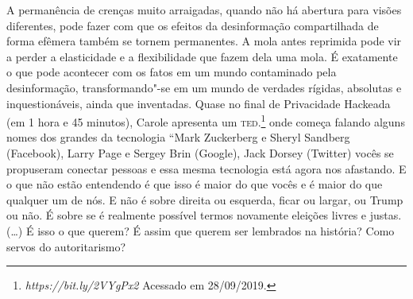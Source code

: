 A permanência de crenças muito arraigadas, quando não há abertura para
visões diferentes, pode fazer com que os efeitos da desinformação
compartilhada de forma efêmera também se tornem permanentes. A mola
antes reprimida pode vir a perder a elasticidade e a flexibilidade que
fazem dela uma mola. É exatamente o que pode acontecer com os fatos em
um mundo contaminado pela desinformação, transformando"-se em um mundo de
verdades rígidas, absolutas e inquestionáveis, ainda que inventadas.
Quase no final de Privacidade Hackeada (em 1 hora e 45 minutos), Carole
apresenta um \textsc{ted}.\footnote{\emph{https://bit.ly/2VYgPx2}
  Acessado em 28/09/2019.} onde começa falando alguns nomes dos grandes
da tecnologia ``Mark Zuckerberg e Sheryl Sandberg (Facebook), Larry Page
e Sergey Brin (Google), Jack Dorsey (Twitter) vocês se propuseram
conectar pessoas e essa mesma tecnologia está agora nos afastando. E o
que não estão entendendo é que isso é maior do que vocês e é maior do
que qualquer um de nós. E não é sobre direita ou esquerda, ficar ou
largar, ou Trump ou não. É sobre se é realmente possível termos
novamente eleições livres e justas. (\ldots{}) É isso o que querem? É assim
que querem ser lembrados na história? Como servos do autoritarismo?

